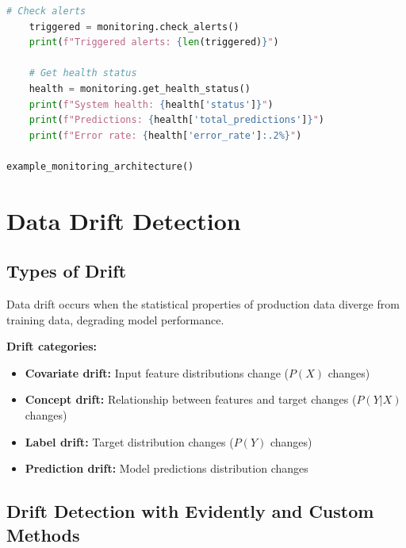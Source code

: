 \begin{lstlisting}[language=Python, caption=ML Monitoring Architecture]
    # Check alerts
    triggered = monitoring.check_alerts()
    print(f"Triggered alerts: {len(triggered)}")

    # Get health status
    health = monitoring.get_health_status()
    print(f"System health: {health['status']}")
    print(f"Predictions: {health['total_predictions']}")
    print(f"Error rate: {health['error_rate']:.2%}")

example_monitoring_architecture()
\end{lstlisting}

\section{Data Drift Detection}

\subsection{Types of Drift}

Data drift occurs when the statistical properties of production data diverge from training data, degrading model performance.

\textbf{Drift categories:}
\begin{itemize}
    \item \textbf{Covariate drift:} Input feature distributions change ($P(X)$ changes)
    \item \textbf{Concept drift:} Relationship between features and target changes ($P(Y|X)$ changes)
    \item \textbf{Label drift:} Target distribution changes ($P(Y)$ changes)
    \item \textbf{Prediction drift:} Model predictions distribution changes
\end{itemize}

\subsection{Drift Detection with Evidently and Custom Methods}

